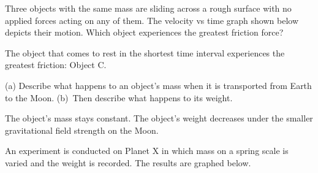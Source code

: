 \documentclass[answers]{exam}
\begin{document}
\begin{questions}
\clearpage
\question 
Three objects with the same mass are sliding across a rough surface with no applied forces acting on any of them. The velocity vs time graph shown below depicts their motion. Which object experiences the greatest friction force?

\begin{center}
\end{center}

\begin{solution}
    The object that comes to rest in the shortest time interval experiences the greatest friction: Object C.
\end{solution}




\question
(a) Describe what happens to an object's mass when it is transported from Earth to the Moon. (b)~Then describe what happens to its weight.

\ifprintanswers
\else
\fillwithlines{3cm}
\fi

\begin{solution}
    The object's mass stays constant. The object's weight decreases under the smaller gravitational field strength on the Moon.
\end{solution}


\question 
An experiment is conducted on Planet X in which mass on a spring scale is varied and the weight is recorded. The results are graphed below. 

\begin{center}
\end{center}


\end{questions}
\end{document}
